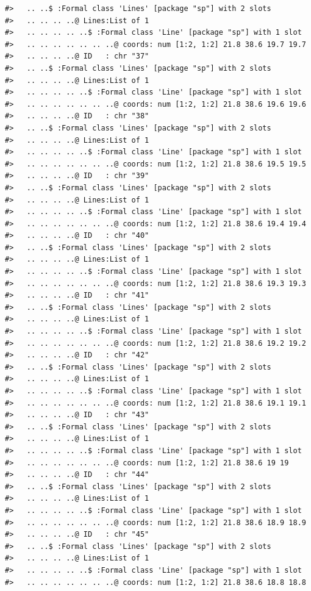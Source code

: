 \documentclass[12pt,a4paper,a4paper]{book}
\theoremstyle{definition}
\theoremstyle{definition}
\theoremstyle{definition}
\theoremstyle{remark}
\begin{document}
\begin{verbatim}
#>   .. ..$ :Formal class 'Lines' [package "sp"] with 2 slots
#>   .. .. .. ..@ Lines:List of 1
#>   .. .. .. .. ..$ :Formal class 'Line' [package "sp"] with 1 slot
#>   .. .. .. .. .. .. ..@ coords: num [1:2, 1:2] 21.8 38.6 19.7 19.7
#>   .. .. .. ..@ ID   : chr "37"
#>   .. ..$ :Formal class 'Lines' [package "sp"] with 2 slots
#>   .. .. .. ..@ Lines:List of 1
#>   .. .. .. .. ..$ :Formal class 'Line' [package "sp"] with 1 slot
#>   .. .. .. .. .. .. ..@ coords: num [1:2, 1:2] 21.8 38.6 19.6 19.6
#>   .. .. .. ..@ ID   : chr "38"
#>   .. ..$ :Formal class 'Lines' [package "sp"] with 2 slots
#>   .. .. .. ..@ Lines:List of 1
#>   .. .. .. .. ..$ :Formal class 'Line' [package "sp"] with 1 slot
#>   .. .. .. .. .. .. ..@ coords: num [1:2, 1:2] 21.8 38.6 19.5 19.5
#>   .. .. .. ..@ ID   : chr "39"
#>   .. ..$ :Formal class 'Lines' [package "sp"] with 2 slots
#>   .. .. .. ..@ Lines:List of 1
#>   .. .. .. .. ..$ :Formal class 'Line' [package "sp"] with 1 slot
#>   .. .. .. .. .. .. ..@ coords: num [1:2, 1:2] 21.8 38.6 19.4 19.4
#>   .. .. .. ..@ ID   : chr "40"
#>   .. ..$ :Formal class 'Lines' [package "sp"] with 2 slots
#>   .. .. .. ..@ Lines:List of 1
#>   .. .. .. .. ..$ :Formal class 'Line' [package "sp"] with 1 slot
#>   .. .. .. .. .. .. ..@ coords: num [1:2, 1:2] 21.8 38.6 19.3 19.3
#>   .. .. .. ..@ ID   : chr "41"
#>   .. ..$ :Formal class 'Lines' [package "sp"] with 2 slots
#>   .. .. .. ..@ Lines:List of 1
#>   .. .. .. .. ..$ :Formal class 'Line' [package "sp"] with 1 slot
#>   .. .. .. .. .. .. ..@ coords: num [1:2, 1:2] 21.8 38.6 19.2 19.2
#>   .. .. .. ..@ ID   : chr "42"
#>   .. ..$ :Formal class 'Lines' [package "sp"] with 2 slots
#>   .. .. .. ..@ Lines:List of 1
#>   .. .. .. .. ..$ :Formal class 'Line' [package "sp"] with 1 slot
#>   .. .. .. .. .. .. ..@ coords: num [1:2, 1:2] 21.8 38.6 19.1 19.1
#>   .. .. .. ..@ ID   : chr "43"
#>   .. ..$ :Formal class 'Lines' [package "sp"] with 2 slots
#>   .. .. .. ..@ Lines:List of 1
#>   .. .. .. .. ..$ :Formal class 'Line' [package "sp"] with 1 slot
#>   .. .. .. .. .. .. ..@ coords: num [1:2, 1:2] 21.8 38.6 19 19
#>   .. .. .. ..@ ID   : chr "44"
#>   .. ..$ :Formal class 'Lines' [package "sp"] with 2 slots
#>   .. .. .. ..@ Lines:List of 1
#>   .. .. .. .. ..$ :Formal class 'Line' [package "sp"] with 1 slot
#>   .. .. .. .. .. .. ..@ coords: num [1:2, 1:2] 21.8 38.6 18.9 18.9
#>   .. .. .. ..@ ID   : chr "45"
#>   .. ..$ :Formal class 'Lines' [package "sp"] with 2 slots
#>   .. .. .. ..@ Lines:List of 1
#>   .. .. .. .. ..$ :Formal class 'Line' [package "sp"] with 1 slot
#>   .. .. .. .. .. .. ..@ coords: num [1:2, 1:2] 21.8 38.6 18.8 18.8

\end{verbatim}
\end{document}
